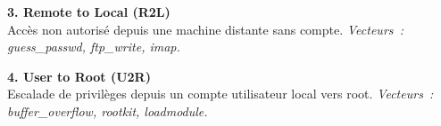 \documentclass{article}
\newlength{\colW}  \setlength{\colW}{180mm}
\newlength{\gapW}  \setlength{\gapW}{15mm}
\newcommand{\bodyfont}{\fontsize{16}{22}\selectfont}
\newcommand{\smallfont}{\fontsize{14}{19}\selectfont}
\begin{document}
\begin{minipage}[t]{\colW}
\begin{tcolorbox}[pc, title={\faBug\; Typologie des Attaques}]
\vspace{4mm}
\bodyfont\color{TextMain}
\textbf{\textcolor{R2LColor}{3. Remote to Local (R2L)}} \\
\smallfont\color{TextMuted} Acc\`es non autoris\'e depuis une machine distante sans compte.
\textit{Vecteurs~: guess\_passwd, ftp\_write, imap.}

\vspace{4mm}
\bodyfont\color{TextMain}
\textbf{\textcolor{U2RColor}{4. User to Root (U2R)}} \\
\smallfont\color{TextMuted} Escalade de privil\`eges depuis un compte utilisateur local vers root.
\textit{Vecteurs~: buffer\_overflow, rootkit, loadmodule.}
\end{tcolorbox}

\end{minipage}%
\hspace{\gapW}%
\end{document}
